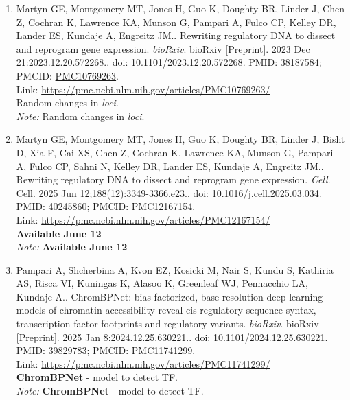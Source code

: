 \documentclass[12pt]{article}
\newcommand{\Pub}[9]{%
  \item #1. #2. \textit{#3}. #4. doi: \href{https://doi.org/#5}{#5}. PMID: \href{https://pubmed.ncbi.nlm.nih.gov/#6/}{#6}; PMCID: \href{https://www.ncbi.nlm.nih.gov/pmc/articles/#7/}{#7}. \\
  \noindent Link: \url{#8}\\
  \ifx#9\relax\else\\\textit{Note:} #9\fi
}
\begin{document}
\begin{enumerate}[leftmargin=*,label=\textbf{\arabic*.}]
\Pub{Martyn GE, Montgomery MT, Jones H, Guo K, Doughty BR, Linder J, Chen Z, Cochran K, Lawrence KA, Munson G, Pampari A, Fulco CP, Kelley DR, Lander ES, Kundaje A, Engreitz JM.}{Rewriting regulatory DNA to dissect and reprogram gene expression}{bioRxiv}{bioRxiv [Preprint]. 2023 Dec 21:2023.12.20.572268.}{10.1101/2023.12.20.572268}{38187584}{PMC10769263}{https://pmc.ncbi.nlm.nih.gov/articles/PMC10769263/}{Random changes in \textit{loci}.}

\Pub{Martyn GE, Montgomery MT, Jones H, Guo K, Doughty BR, Linder J, Bisht D, Xia F, Cai XS, Chen Z, Cochran K, Lawrence KA, Munson G, Pampari A, Fulco CP, Sahni N, Kelley DR, Lander ES, Kundaje A, Engreitz JM.}{Rewriting regulatory DNA to dissect and reprogram gene expression}{Cell}{Cell. 2025 Jun 12;188(12):3349-3366.e23.}{10.1016/j.cell.2025.03.034}{40245860}{PMC12167154}{https://pmc.ncbi.nlm.nih.gov/articles/PMC12167154/}{\textbf{Available June 12}}

\Pub{Pampari A, Shcherbina A, Kvon EZ, Kosicki M, Nair S, Kundu S, Kathiria AS, Risca VI, Kuningas K, Alasoo K, Greenleaf WJ, Pennacchio LA, Kundaje A.}{ChromBPNet: bias factorized, base-resolution deep learning models of chromatin accessibility reveal cis-regulatory sequence syntax, transcription factor footprints and regulatory variants}{bioRxiv}{bioRxiv [Preprint]. 2025 Jan 8:2024.12.25.630221.}{10.1101/2024.12.25.630221}{39829783}{PMC11741299}{https://pmc.ncbi.nlm.nih.gov/articles/PMC11741299/}{\textbf{ChromBPNet} - model to detect TF.}
\end{enumerate}
\end{document}
